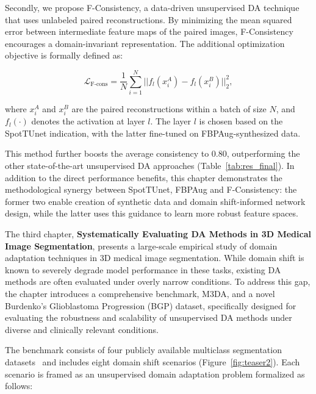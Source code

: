 Secondly, we propose F-Consistency, a data-driven unsupervised DA technique that uses unlabeled paired reconstructions. By minimizing the mean squared error between intermediate feature maps of the paired images, F-Consistency encourages a domain-invariant representation. The additional optimization objective is formally defined as:

\begin{equation}
	\mathcal{L}_{\text{F-cons}} = \frac{1}{N} \sum_{i=1}^{N} || f_l \left( x_i^A \right) - f_l \left( x_i^B \right) ||_2^2,
\end{equation}

\noindent
where $x_i^A$ and $x_i^B$ are the paired reconstructions within a batch of size $N$, and $f_l \left( \cdot \right)$ denotes the activation at layer $l$. The layer $l$ is chosen based on the SpotTUnet indication, with the latter fine-tuned on FBPAug-synthesized data.

This method further boosts the average consistency to 0.80, outperforming the other state-of-the-art unsupervised DA approaches (Table~\ref{tab:res_final}). In addition to the direct performance benefits, this chapter demonstrates the methodological synergy between SpotTUnet, FBPAug and F-Consistency: the former two enable creation of synthetic data and domain shift-informed network design, while the latter uses this guidance to learn more robust feature spaces.




The third chapter, \textbf{Systematically Evaluating DA Methods in 3D Medical Image Segmentation}, presents a large-scale empirical study of domain adaptation techniques in 3D medical image segmentation. While domain shift is known to severely degrade model performance in these tasks, existing DA methods are often evaluated under overly narrow conditions. To address this gap, the chapter introduces a comprehensive benchmark, M3DA, and a novel Burdenko’s Glioblastoma Progression (BGP) dataset, specifically designed for evaluating the robustness and scalability of unsupervised DA methods under diverse and clinically relevant conditions.

The benchmark consists of four publicly available multiclass segmentation datasets~\cite{amos,brats,cc359,lidc} and includes eight domain shift scenarios (Figure~\ref{fig:teaser2}). Each scenario is framed as an unsupervised domain adaptation problem formalized as follows:

